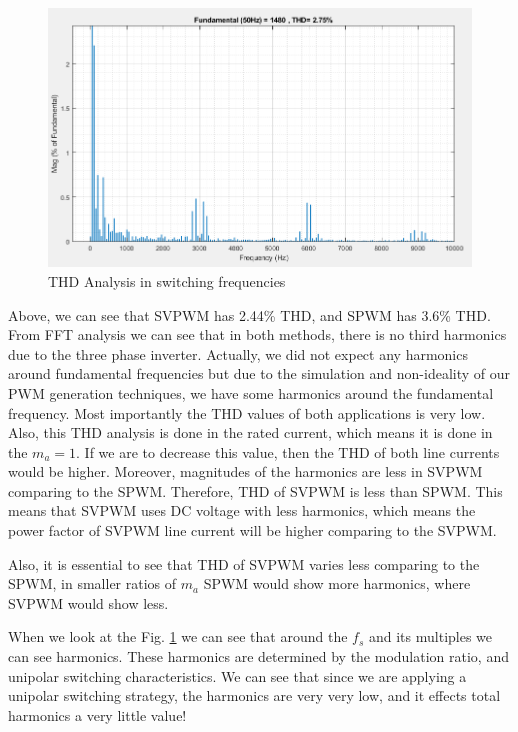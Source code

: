 \begin{center}
\begin{figure}[H]
\centering
\includegraphics [width= 12 cm]{figs/THD_sv.png}
\caption{THD Analysis in switching frequencies}
\label{fig:thd_switch}
\end{figure}
\end{center}
        
        


Above, we can see that SVPWM has 2.44\% THD, and SPWM has 3.6\% THD. From FFT analysis we can see that in both methods, there is no third harmonics due to the three phase inverter. Actually, we did not expect any harmonics around fundamental frequencies but due to the simulation and non-ideality of our PWM generation techniques, we have some harmonics around the fundamental frequency. Most importantly the THD values of both applications is very low. Also, this THD analysis is done in the rated current, which means it is done in the $m_a = 1$. If we are to decrease this value, then the THD of both line currents would be higher. Moreover, magnitudes of the harmonics are less in SVPWM comparing to the SPWM. Therefore, THD of SVPWM is less than SPWM. This means that SVPWM uses DC voltage with less harmonics, which means the power factor of SVPWM line current will be higher comparing to the SVPWM.

Also, it is essential to see that THD of SVPWM varies less comparing to the SPWM, in smaller ratios of $m_a$ SPWM would show more harmonics, where SVPWM would show less.

When we look at the Fig. \ref{fig:thd_switch} we can see that around the $f_s$ and its multiples we can see harmonics. These harmonics are determined by the modulation ratio, and unipolar switching characteristics. We can see that since we are applying a unipolar switching strategy, the harmonics are very very low, and it effects total harmonics a very little value!




